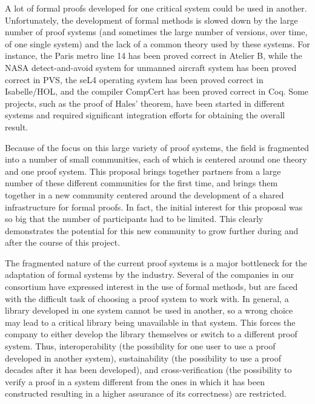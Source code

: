 
A lot of formal proofs developed for one critical system could be used
in another.  Unfortunately, the development of formal methods is
slowed down by the large number of proof systems (and sometimes the
large number of versions, over time, of one single system) and the
lack of a common theory used by these systems.  For instance, the
Paris metro line 14 has been proved correct in Atelier B, while the
NASA detect-and-avoid system for unmanned aircraft system has been
proved correct in PVS, the seL4 operating system has been proved
correct in Isabelle/HOL\cite{paulson700}, and the compiler CompCert
has been proved correct in Coq.  Some projects, such as the proof of
Hales' theorem, have been started in different systems and required
significant integration efforts for obtaining the overall result.

Because of the focus on this large variety of proof systems, the field
is fragmented into a number of small communities, each of which is
centered around one theory and one proof system. This proposal brings
together partners from a large number of these different communities
for the first time, and brings them together in a new community
centered around the development of a shared infrastructure for formal
proofs. In fact, the initial interest for this proposal was so big
that the number of participants had to be limited.  This clearly
demonstrates the potential for this new community to grow further
during and after the course of this project.

The fragmented nature of the current proof systems is a major
bottleneck for the adaptation of formal systems by the
industry. Several of the companies in our consortium have expressed
interest in the use of formal methods, but are faced with the
difficult task of choosing a proof system to work with. In general, a
library developed in one system cannot be used in another, so a wrong
choice may lead to a critical library being unavailable in that
system. This forces the company to either develop the library
themselves or switch to a different proof system.  Thus,
interoperability (the possibility for one user to use a proof
developed in another system), sustainability (the possibility to use a
proof decades after it has been developed), and cross-verification
(the possibility to verify a proof in a system different from the ones
in which it has been constructed resulting in a higher assurance of
its correctness) are restricted.

